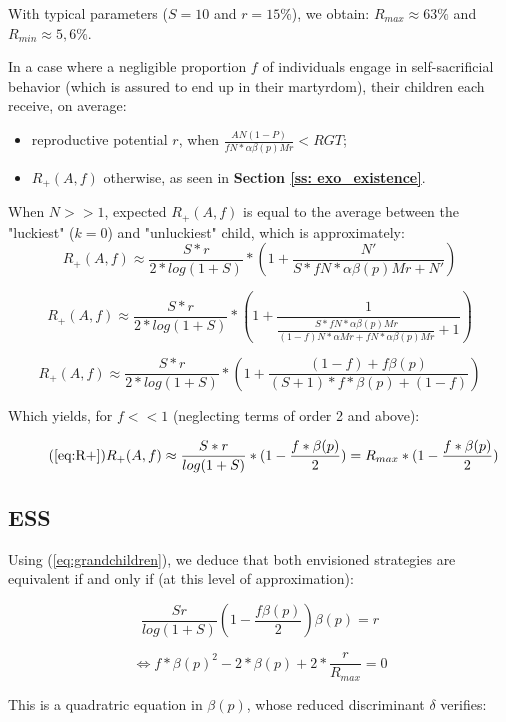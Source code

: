 \documentclass[a4paper,12pt]{report}
\begin{document}
With typical parameters ($S=10$ and $r=15\%$), we obtain: $R_{max} \approx 63 \%$ and 
$R_{min} \approx 5,6 \%$.

In a case where a negligible proportion $f$ of individuals engage in
self-sacrificial behavior (which is assured to end up in their martyrdom), their children each
receive, on average:
\begin{itemize}
\item reproductive potential $r$, when $\frac{AN(1-P)}{fN*\alpha\beta(p)Mr} < RGT$;
\item $R_{+}(A,f)$ otherwise, as seen in \textbf{Section \ref{ss: exo_existence}}.
\end{itemize}

When $N>>1$, expected $R_+(A,f)$ is equal to the average between the "luckiest" ($k=0$) and "unluckiest"
child, which is approximately:
\[ R_+(A,f) \approx \frac{S*r}{2*log(1+S)} * (1 + \frac{N'}{S*fN*\alpha\beta(p)Mr+N'})\]

\[ R_+(A,f) \approx \frac{S*r}{2*log(1+S)} * (1 + \frac{1}{\frac{S*fN*\alpha\beta(p)Mr}{(1-f)N*\alpha Mr + fN*\alpha\beta(p)Mr}+1})\]

\[ R_+(A,f) \approx \frac{S*r}{2*log(1+S)} * (1 + \frac{(1-f) + f\beta(p)}{(S+1)*f*\beta(p)+(1-f)})\]

Which yields, for $f<<1$ (neglecting terms of order 2 and above):

\begin{equation}
    \tag{\ref{eq:R+}}
    R_+(A,f) \approx  \frac{S*r}{log(1+S)} * (1 - \frac{f*\beta(p)}{2}) = R_{max}*(1-\frac{f*\beta(p)}{2})
\end{equation}

\subsection{ESS}
\label{ss_e_a:ESS}

Using (\ref{eq:grandchildren}), we deduce that both envisioned strategies are equivalent if
and only if (at this level of approximation):

\[\frac{Sr}{log(1+S)}(1-\frac{f\beta(p)}{2})\beta(p)=r  \]

\begin{equation}
    \label{eq:trinome_beta}
    \iff f*\beta(p)^2 - 2*\beta(p) + 2*\frac{r}{R_{max}} = 0
\end{equation}

This is a quadratric equation in $\beta(p)$, whose reduced discriminant $\delta$ verifies:
\end{document}
